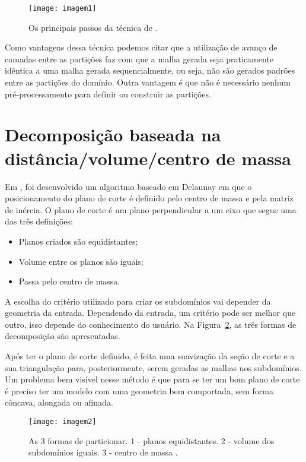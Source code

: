  \begin{figure}[htbp]
     \centering
     \texttt{[image: imagem1]}
     \caption{Os principais passos da técnica de \cite{bib:Pirzadeh09}.}
     \label{fig:imagem1}
 \end{figure}
 
 Como vantagens dessa técnica podemos citar que a utilização de avanço de camadas entre as partições faz com que a malha gerada seja praticamente idêntica a uma malha gerada sequencialmente, ou seja, não são gerados padrões entre as partições do domínio. Outra vantagem é que não é necessário nenhum pré-processamento para definir ou construir as partições.

\section{Decomposição baseada na distância/volume/centro de massa}
 
Em \cite{bib:Ivanov06}, foi desenvolvido um algoritmo baseado em Delaunay em que o posicionamento do plano de corte é definido pelo centro de massa e pela matriz de inércia. O plano de corte é um plano perpendicular a um eixo que segue uma das três definições:

\begin{itemize}
  \item Planos criados são equidistantes;

  \item Volume entre os planos são iguais;

  \item Passa pelo centro de massa.
\end{itemize}

A escolha do critério utilizado para criar os subdomínios vai depender da geometria da entrada. Dependendo da entrada, um critério pode ser melhor que outro, isso depende do conhecimento do usuário. Na Figura~\ref{fig:imagem2}, as três formas de decomposição são apresentadas.

Após ter o plano de corte definido, é feita uma suavização da seção de corte e a sua triangulação para, posteriormente, serem geradas as malhas nos subdomínios. Um problema bem visível nesse método é que para se ter um bom plano de corte é preciso ter um modelo com uma geometria bem comportada, sem forma côncava, alongada ou afinada.

 \begin{figure}[htbp]
     \centering
     \texttt{[image: imagem2]}
     \caption{As 3 formas de particionar. 1 - planos equidistantes. 2 - volume dos subdomínios iguais. 3 - centro de massa \cite{bib:Ivanov06}.}
     \label{fig:imagem2}
 \end{figure}


